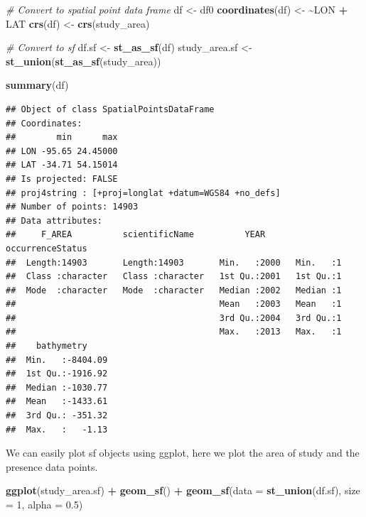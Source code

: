 \documentclass[
]{book}
\newenvironment{Shaded}{\begin{snugshade}}{\end{snugshade}}
\newcommand{\AttributeTok}[1]{\textcolor[rgb]{0.13,0.29,0.53}{#1}}
\newcommand{\CommentTok}[1]{\textcolor[rgb]{0.56,0.35,0.01}{\textit{#1}}}
\newcommand{\DecValTok}[1]{\textcolor[rgb]{0.00,0.00,0.81}{#1}}
\newcommand{\ErrorTok}[1]{\textcolor[rgb]{0.64,0.00,0.00}{\textbf{#1}}}
\newcommand{\FloatTok}[1]{\textcolor[rgb]{0.00,0.00,0.81}{#1}}
\newcommand{\FunctionTok}[1]{\textcolor[rgb]{0.13,0.29,0.53}{\textbf{#1}}}
\newcommand{\NormalTok}[1]{#1}
\newcommand{\OtherTok}[1]{\textcolor[rgb]{0.56,0.35,0.01}{#1}}
\newcommand{\SpecialCharTok}[1]{\textcolor[rgb]{0.81,0.36,0.00}{\textbf{#1}}}
\begin{document}
\begin{Shaded}
\begin{Highlighting}[]
\CommentTok{\# Convert to spatial point data frame}
\NormalTok{df }\OtherTok{\textless{}{-}}\NormalTok{ df0}
\FunctionTok{coordinates}\NormalTok{(df) }\OtherTok{\textless{}{-}} \ErrorTok{\textasciitilde{}}\NormalTok{LON }\SpecialCharTok{+}\NormalTok{ LAT}
\FunctionTok{crs}\NormalTok{(df) }\OtherTok{\textless{}{-}} \FunctionTok{crs}\NormalTok{(study\_area)}

\CommentTok{\# Convert to sf}
\NormalTok{df.sf }\OtherTok{\textless{}{-}} \FunctionTok{st\_as\_sf}\NormalTok{(df)}
\NormalTok{study\_area.sf }\OtherTok{\textless{}{-}} \FunctionTok{st\_union}\NormalTok{(}\FunctionTok{st\_as\_sf}\NormalTok{(study\_area))}


\FunctionTok{summary}\NormalTok{(df)}
\end{Highlighting}
\end{Shaded}

\begin{verbatim}
## Object of class SpatialPointsDataFrame
## Coordinates:
##        min      max
## LON -95.65 24.45000
## LAT -34.71 54.15014
## Is projected: FALSE 
## proj4string : [+proj=longlat +datum=WGS84 +no_defs]
## Number of points: 14903
## Data attributes:
##     F_AREA          scientificName          YEAR      occurrenceStatus
##  Length:14903       Length:14903       Min.   :2000   Min.   :1       
##  Class :character   Class :character   1st Qu.:2001   1st Qu.:1       
##  Mode  :character   Mode  :character   Median :2002   Median :1       
##                                        Mean   :2003   Mean   :1       
##                                        3rd Qu.:2004   3rd Qu.:1       
##                                        Max.   :2013   Max.   :1       
##    bathymetry      
##  Min.   :-8404.09  
##  1st Qu.:-1916.92  
##  Median :-1030.77  
##  Mean   :-1433.61  
##  3rd Qu.: -351.32  
##  Max.   :   -1.13
\end{verbatim}

We can easily plot sf objects using ggplot, here we plot the area of study and the presence data points.

\begin{Shaded}
\begin{Highlighting}[]
\FunctionTok{ggplot}\NormalTok{(study\_area.sf) }\SpecialCharTok{+} \FunctionTok{geom\_sf}\NormalTok{() }\SpecialCharTok{+} \FunctionTok{geom\_sf}\NormalTok{(}\AttributeTok{data =} \FunctionTok{st\_union}\NormalTok{(df.sf),}
    \AttributeTok{size =} \DecValTok{1}\NormalTok{, }\AttributeTok{alpha =} \FloatTok{0.5}\NormalTok{)}
\end{Highlighting}
\end{Shaded}
\end{document}
